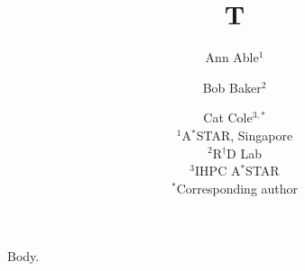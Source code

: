 \documentclass{article}
\begin{document}
\title{T}
\author{Ann Able$^1$ \and Bob Baker$^{2}$ \and Cat Cole$^{3,*}$\\ $^1$A$^*$STAR, Singapore\\ $^2$R$^\dagger$D Lab\\ $^3$IHPC A$^*$STAR\\ $^*$Corresponding author}
\maketitle
Body.
\end{document}
